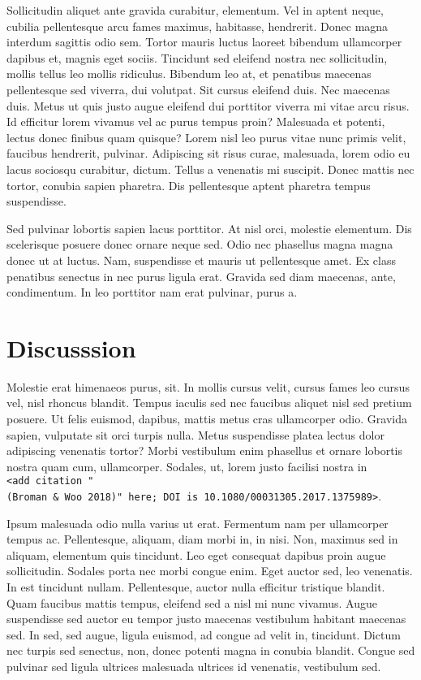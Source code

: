 \documentclass[
  11pt,
]{report}
\begin{document}
Sollicitudin aliquet ante gravida curabitur, elementum. Vel in aptent
neque, cubilia pellentesque arcu fames maximus, habitasse, hendrerit.
Donec magna interdum sagittis odio sem. Tortor mauris luctus laoreet
bibendum ullamcorper dapibus et, magnis eget sociis. Tincidunt sed
eleifend nostra nec sollicitudin, mollis tellus leo mollis ridiculus.
Bibendum leo at, et penatibus maecenas pellentesque sed viverra, dui
volutpat. Sit cursus eleifend duis. Nec maecenas duis. Metus ut quis
justo augue eleifend dui porttitor viverra mi vitae arcu risus. Id
efficitur lorem vivamus vel ac purus tempus proin? Malesuada et potenti,
lectus donec finibus quam quisque? Lorem nisl leo purus vitae nunc
primis velit, faucibus hendrerit, pulvinar. Adipiscing sit risus curae,
malesuada, lorem odio eu lacus sociosqu curabitur, dictum. Tellus a
venenatis mi suscipit. Donec mattis nec tortor, conubia sapien pharetra.
Dis pellentesque aptent pharetra tempus suspendisse.

Sed pulvinar lobortis sapien lacus porttitor. At nisl orci, molestie
elementum. Dis scelerisque posuere donec ornare neque sed. Odio nec
phasellus magna magna donec ut at luctus. Nam, suspendisse et mauris ut
pellentesque amet. Ex class penatibus senectus in nec purus ligula erat.
Gravida sed diam maecenas, ante, condimentum. In leo porttitor nam erat
pulvinar, purus a.

\hypertarget{discusssion}{%
\chapter{Discusssion}\label{discusssion}}

Molestie erat himenaeos purus, sit. In mollis cursus velit, cursus fames
leo cursus vel, nisl rhoncus blandit. Tempus iaculis sed nec faucibus
aliquet nisl sed pretium posuere. Ut felis euismod, dapibus, mattis
metus cras ullamcorper odio. Gravida sapien, vulputate sit orci turpis
nulla. Metus suspendisse platea lectus dolor adipiscing venenatis
tortor? Morbi vestibulum enim phasellus et ornare lobortis nostra quam
cum, ullamcorper. Sodales, ut, lorem justo facilisi nostra in
\texttt{\textless{}add\ citation\ "(Broman\ \&\ Woo\ 2018)"\ here;\ DOI\ is\ 10.1080/00031305.2017.1375989\textgreater{}}.

Ipsum malesuada odio nulla varius ut erat. Fermentum nam per ullamcorper
tempus ac. Pellentesque, aliquam, diam morbi in, in nisi. Non, maximus
sed in aliquam, elementum quis tincidunt. Leo eget consequat dapibus
proin augue sollicitudin. Sodales porta nec morbi congue enim. Eget
auctor sed, leo venenatis. In est tincidunt nullam. Pellentesque, auctor
nulla efficitur tristique blandit. Quam faucibus mattis tempus, eleifend
sed a nisl mi nunc vivamus. Augue suspendisse sed auctor eu tempor justo
maecenas vestibulum habitant maecenas sed. In sed, sed augue, ligula
euismod, ad congue ad velit in, tincidunt. Dictum nec turpis sed
senectus, non, donec potenti magna in conubia blandit. Congue sed
pulvinar sed ligula ultrices malesuada ultrices id venenatis, vestibulum
sed.
\end{document}
